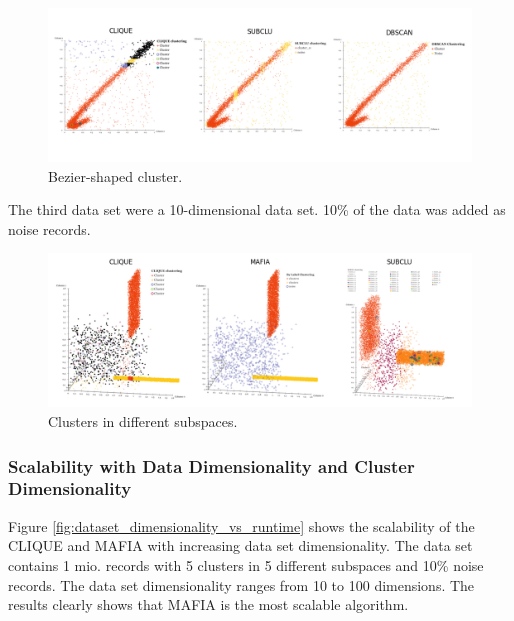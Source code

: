 \begin{figure}
    \centering
    \includegraphics[scale=0.45]{figures/accuracy_bezier.png}
    \caption{Bezier-shaped cluster.}
    \label{fig:accuracy_bezier}
\end{figure}

The third data set were a 10-dimensional data set. 10\% of the data was added as noise records.

\begin{figure}
    \centering
    \includegraphics[scale=0.45]{figures/accuracy_2clusters.png}
    \caption{Clusters in different subspaces.}
    \label{fig:accuracy_2clusters}
\end{figure}

\subsubsection{Scalability with Data Dimensionality and Cluster Dimensionality}
Figure \ref{fig:dataset_dimensionality_vs_runtime} shows the scalability of the CLIQUE and MAFIA with increasing data set dimensionality. The data set contains 1 mio. records with 5 clusters in 5 different subspaces and 10\% noise records. The data set dimensionality ranges from 10 to 100 dimensions. The results clearly shows that MAFIA is the most scalable algorithm.


